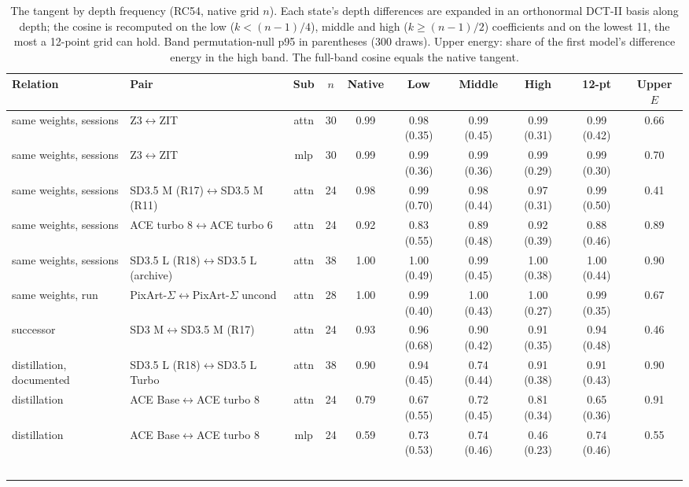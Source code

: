 \begin{table}[htbp]
\centering\scriptsize\setlength\tabcolsep{2pt}
\caption{The tangent by depth frequency (RC54, native grid $n$). Each state's depth differences are expanded in an orthonormal DCT-II basis along depth; the cosine is recomputed on the low ($k<(n-1)/4$), middle and high ($k\ge(n-1)/2$) coefficients and on the lowest 11, the most a 12-point grid can hold. Band permutation-null p95 in parentheses (300 draws). Upper energy: share of the first model's difference energy in the high band. The full-band cosine equals the native tangent.}
\label{tab:bands}
\begin{tabularx}{\linewidth}{@{}>{\raggedright\arraybackslash}p{1.9cm}Lcccccccc@{}}
\toprule
Relation & Pair & Sub & $n$ & Native & Low & Middle & High & 12-pt & Upper $E$\\
\midrule
same weights, sessions & Z3$\leftrightarrow$ZIT & attn & 30 & 0.99 & 0.98 (0.35) & 0.99 (0.45) & 0.99 (0.31) & 0.99 (0.42) & 0.66\\
same weights, sessions & Z3$\leftrightarrow$ZIT & mlp & 30 & 0.99 & 0.99 (0.36) & 0.99 (0.36) & 0.99 (0.29) & 0.99 (0.30) & 0.70\\
same weights, sessions & SD3.5 M (R17)$\leftrightarrow$SD3.5 M (R11) & attn & 24 & 0.98 & 0.99 (0.70) & 0.98 (0.44) & 0.97 (0.31) & 0.99 (0.50) & 0.41\\
same weights, sessions & ACE turbo 8$\leftrightarrow$ACE turbo 6 & attn & 24 & 0.92 & 0.83 (0.55) & 0.89 (0.48) & 0.92 (0.39) & 0.88 (0.46) & 0.89\\
same weights, sessions & SD3.5 L (R18)$\leftrightarrow$SD3.5 L (archive) & attn & 38 & 1.00 & 1.00 (0.49) & 0.99 (0.45) & 1.00 (0.38) & 1.00 (0.44) & 0.90\\
same weights, run & PixArt-$\Sigma$$\leftrightarrow$PixArt-$\Sigma$ uncond & attn & 28 & 1.00 & 0.99 (0.40) & 1.00 (0.43) & 1.00 (0.27) & 0.99 (0.35) & 0.67\\
successor & SD3 M$\leftrightarrow$SD3.5 M (R17) & attn & 24 & 0.93 & 0.96 (0.68) & 0.90 (0.42) & 0.91 (0.35) & 0.94 (0.48) & 0.46\\
distillation, documented & SD3.5 L (R18)$\leftrightarrow$SD3.5 L Turbo & attn & 38 & 0.90 & 0.94 (0.45) & 0.74 (0.44) & 0.91 (0.38) & 0.91 (0.43) & 0.90\\
distillation & ACE Base$\leftrightarrow$ACE turbo 8 & attn & 24 & 0.79 & 0.67 (0.55) & 0.72 (0.45) & 0.81 (0.34) & 0.65 (0.36) & 0.91\\
distillation & ACE Base$\leftrightarrow$ACE turbo 8 & mlp & 24 & 0.59 & 0.73 (0.53) & 0.74 (0.46) & 0.46 (0.23) & 0.74 (0.46) & 0.55\\
$$
\end{tabularx}
\end{table}
